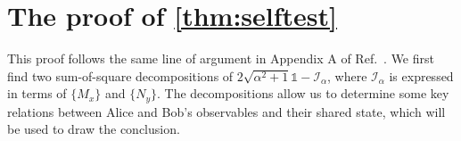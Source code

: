 \documentclass[11pt,letterpaper]{article}
\newcommand{\ket}[1]{|#1\rangle}
\newcommand{\ketbra}[2]{|#1\rangle\langle#2|}
\DeclareMathOperator{\Tr}{Tr}
\DeclareMathOperator{\supp}{supp}
\newcommand{\1}{\mathbb{1}}
\newcommand{\CHSH}{CHSH^{(d)}}
\newcommand{\SVT}{SVT}
\newcommand{\tA}{\tilde{A}}
\newcommand{\tU}{\tilde{U}}
\newcommand{\I}{\mathcal{I}}
\theoremstyle{definition}
\begin{document}




\appendix
\section{The proof of \cref{thm:selftest} }
\label{sec:selftest}
This proof follows the same line of argument in Appendix A of Ref.~\cite{bamps2015}.
We first find two sum-of-square decompositions of $2\sqrt{\alpha^2+1} \1 - \I_\alpha$,
where $\I_\alpha$ is expressed in terms of $\{M_x\}$ and $\{N_y\}$.
The decompositions allow us to determine some key relations between Alice and Bob's observables
and their shared state, which will be used to draw the conclusion.
\end{document}
